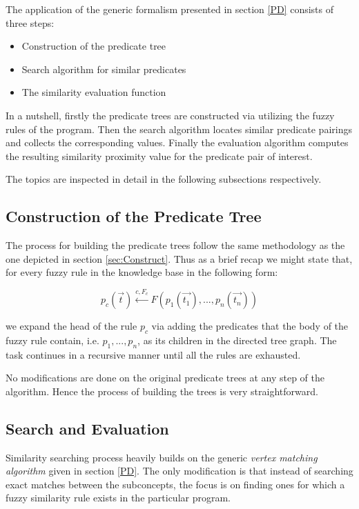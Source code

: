 \documentclass[egilmezThesis.tex]{subfiles}
\begin{document}
The application of the generic formalism presented in section \ref{PD} consists of three steps:
\begin{itemize}
\item Construction of the predicate tree
\item Search algorithm for similar predicates
\item The similarity evaluation function
\end{itemize}

In a nutshell, firstly the predicate trees are constructed via utilizing the fuzzy rules of the program. Then the search algorithm locates similar predicate pairings and collects the corresponding values. Finally the evaluation algorithm computes the resulting similarity proximity value for the predicate pair of interest.

The topics are inspected in detail in the following subsections respectively.

\subsection{Construction of the Predicate Tree}
\label{eval}

The process for building the predicate trees follow the same methodology as the one depicted in section \ref{sec:Construct}. Thus as a brief recap we might state that, for every fuzzy rule in the knowledge base in the following form:

\[p_{c}(\vec{t}) \stackrel{c,F_c}{\longleftarrow}F(p_1(\vec{t_1}),...,p_n(\vec{t_n}))\] 

we expand the head of the rule $p_c$ via adding the predicates that the body of the fuzzy rule contain, i.e. $p_1, ..., p_n$, as its children in the directed tree graph. The task continues in a recursive manner until all the rules are exhausted. 

No modifications are done on the original predicate trees at any step of the algorithm. Hence the process of building the trees is very straightforward.



\subsection{Search and Evaluation}
\label{SandE}

Similarity searching process heavily builds on the generic  \textit{vertex matching algorithm} given in section \ref{PD}. The only modification is that instead of searching exact matches between the subconcepts, the focus is on finding ones for which a fuzzy similarity rule exists in the particular program.
\end{document}
